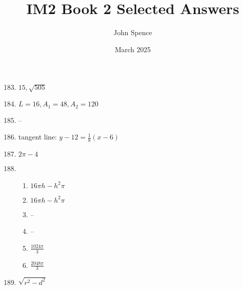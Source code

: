 \documentclass{article}
\title{IM2 Book 2 Selected Answers}
\author{John Spence}
\date{March 2025}
\begin{document}
\maketitle

\begin{enumerate}

\setcounter{enumi}{182}

\item $15, \sqrt{505}$

\item $ L = 16, A_1 = 48, A_2 = 120$

\item --

\item tangent line: $y - 12 = \frac{1}{8}(x-6)$

\item $2\pi - 4$

\item

	\begin{enumerate}
	
	\item $16 \pi h - h^2 \pi$
	
	\item $ 16 \pi h - h^2 \pi$
	
	\item --
	
	\item --
	
	\item $\frac{1024\pi}{3}$
	
	\item $\frac{2048\pi}{3}$
	
	\end{enumerate}
	
\item $\sqrt{r^2 - d^2}$

\end{enumerate}
\end{document}
